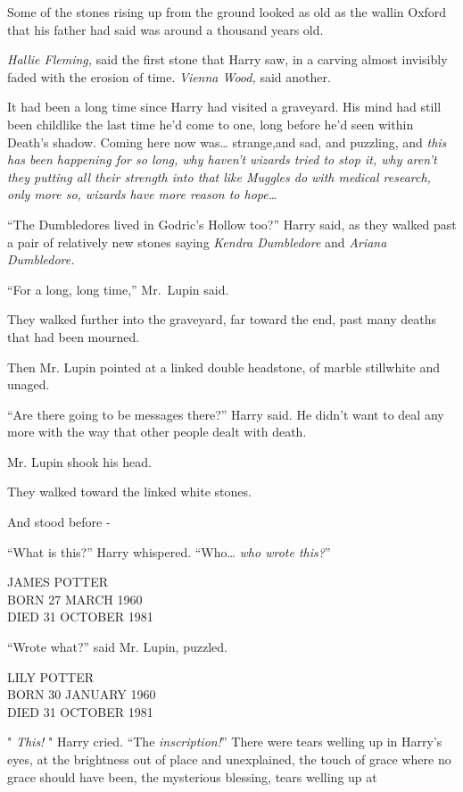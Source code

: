 Some of the stones rising up from the ground looked as old as the wallin Oxford that his father had said was around a thousand years old.

\emph{Hallie Fleming,} said the first stone that Harry saw, in a carving almost invisibly faded with the erosion of time. \emph{Vienna Wood,} said another.

It had been a long time since Harry had visited a graveyard. His mind had still been childlike the last time he'd come to one, long before he'd seen within Death's shadow. Coming here now was\ldots{} strange,and sad, and puzzling, and \emph{this has been happening for so long, why haven't wizards tried to stop it, why aren't they putting all their strength into that like Muggles do with medical research, only more so, wizards have more reason to hope\ldots{}}

``The Dumbledores lived in Godric's Hollow too?'' Harry said, as they walked past a pair of relatively new stones saying \emph{Kendra Dumbledore} and \emph{Ariana Dumbledore.}

``For a long, long time,'' Mr.~Lupin said.

They walked further into the graveyard, far toward the end, past many deaths that had been mourned.

Then Mr. Lupin pointed at a linked double headstone, of marble stillwhite and unaged.

``Are there going to be messages there?'' Harry said. He didn't want to deal any more with the way that other people dealt with death.

Mr. Lupin shook his head.

They walked toward the linked white stones.

And stood before -

``What is this?'' Harry whispered. ``Who\ldots{} \emph{who wrote this?}''

JAMES POTTER\\ BORN 27 MARCH 1960\\ DIED 31 OCTOBER 1981

``Wrote what?'' said Mr. Lupin, puzzled.

LILY POTTER\\ BORN 30 JANUARY 1960\\ DIED 31 OCTOBER 1981

" \emph{This!} " Harry cried. ``The \emph{inscription!}'' There were tears welling up in Harry's eyes, at the brightness out of place and unexplained, the touch of grace where no grace should have been, the mysterious blessing, tears welling up at

